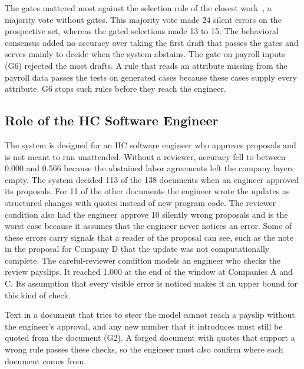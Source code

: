 The gates mattered most against the selection rule of the closest work~\cite{goganikhiabani2025maintaining}, a majority vote without gates. This majority vote made 24 silent errors on the prospective set, whereas the gated selections made 13 to 15. The behavioral consensus added no accuracy over taking the first draft that passes the gates and serves mainly to decide when the system abstains. The gate on payroll inputs (G6) rejected the most drafts. A rule that reads an attribute missing from the payroll data passes the tests on generated cases because these cases supply every attribute. G6 stops such rules before they reach the engineer.

\subsection{Role of the HC Software Engineer}
The system is designed for an HC software engineer who approves proposals and is not meant to run unattended. Without a reviewer, accuracy fell to between 0.000 and 0.566 because the abstained labor agreements left the company layers empty. The system decided 113 of the 138 documents when an engineer approved its proposals. For 11 of the other documents the engineer wrote the updates as structured changes with quotes instead of new program code. The reviewer condition also had the engineer approve 10 silently wrong proposals and is the worst case because it assumes that the engineer never notices an error. Some of these errors carry signals that a reader of the proposal can see, such as the note in the proposal for Company D that the update was not computationally complete. The careful-reviewer condition models an engineer who checks the review payslips. It reached 1.000 at the end of the window at Companies A and C. Its assumption that every visible error is noticed makes it an upper bound for this kind of check.

Text in a document that tries to steer the model cannot reach a payslip without the engineer's approval, and any new number that it introduces must still be quoted from the document (G2). A forged document with quotes that support a wrong rule passes these checks, so the engineer must also confirm where each document comes from.

